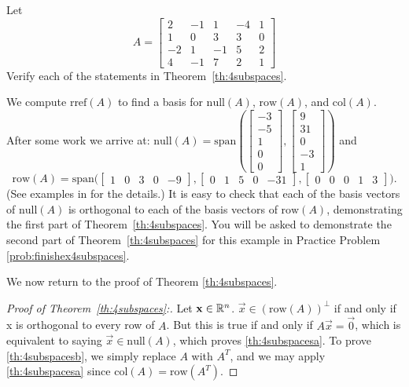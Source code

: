\documentclass{ximera}
\begin{document}
\begin{example}\label{ex:4subspaces}
Let
$$A=\begin{bmatrix}2&-1&1&-4&1\\1&0&3&3&0\\-2&1&-1&5&2\\4&-1&7&2&1\end{bmatrix}$$
Verify each of the statements in Theorem~\ref{th:4subspaces}.

\begin{explanation}
 We compute $\mbox{rref}(A)$ to find a basis for   $\mbox{null}(A)$, $\mbox{row}(A)$, and $\mbox{col}(A)$.  After some work we arrive at:
 $\mbox{null}(A) = \mbox{span}\left(\begin{bmatrix}-3\\-5\\1\\0\\0\end{bmatrix}, \begin{bmatrix}9\\31\\0\\-3\\1\end{bmatrix}\right)$ 
 and
 $$\mbox{row}(A)=\mbox{span}\Big(\begin{bmatrix}1&0&3&0&-9\end{bmatrix},
\begin{bmatrix}0&1&5&0&-31\end{bmatrix},
\begin{bmatrix}0&0&0&1&3\end{bmatrix}\Big).$$  (See examples in  for the details.) It is easy to check that each of the basis vectors of $\mbox{null}(A)$ is orthogonal to each of the basis vectors of $\mbox{row}(A)$, demonstrating the first part of Theorem~\ref{th:4subspaces}.  You will be asked to demonstrate the second part of Theorem~\ref{th:4subspaces} for this example in Practice Problem \ref{prob:finishex4subspaces}.
\end{explanation}
\end{example}

We now return to the proof of Theorem \ref{th:4subspaces}.

\begin{proof}[Proof of Theorem~\ref{th:4subspaces}:]
Let $\mathbf{x}\in\mathbb{R}^n$.  $\vec{x}\in\left(\mbox{row}(A)\right)^\perp$ if and only if x is orthogonal to every row of $A$.  But this is true if and only if $A\vec{x}=\vec{0}$, which is equivalent to saying $\vec{x}\in\mbox{null}(A)$, which proves \ref{th:4subspacesa}.  To prove \ref{th:4subspacesb}, we simply replace $A$ with $A^T$, and we may apply \ref{th:4subspacesa} since $\mbox{col}(A) = \mbox{row}(A^T)$.
\end{proof}
\end{document}
